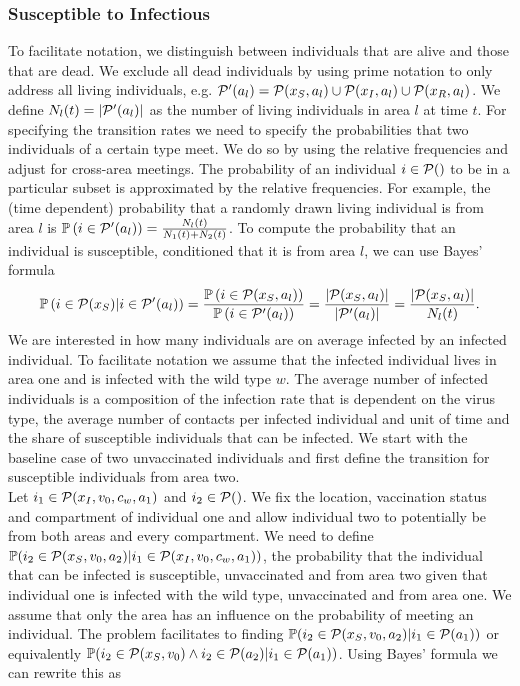 \subsubsection*{Susceptible to Infectious}
To facilitate notation, we distinguish between individuals that are alive and those that are dead. We exclude all dead individuals by using prime notation to only address all living individuals, e.g. $\mathcal{P}'(a_l) =  \mathcal{P}(x_S, a_l) \cup \mathcal{P}(x_I, a_l) \cup \mathcal{P}(x_R, a_l)$. We define $N_l(t) = |\mathcal{P}'(a_l) |$ as the number of living individuals in area $l$ at time $t$. For specifying the transition rates we need to specify the probabilities that two individuals of a certain type meet. We do so by using the relative frequencies and adjust for cross-area meetings. The probability of an individual $i \in \mathcal{P}()$ to be in a particular subset is approximated by the relative frequencies. For example, the (time dependent) probability that a randomly drawn living individual is from area $l$ is $\mathbb{P}\left(i \in \mathcal{P}'(a_l) \right) = \frac{N_l(t)}{N_1(t) + N_2(t)}$. To compute the probability that an individual is susceptible, conditioned that it is from area $l$, we can use Bayes' formula 
\begin{align}
\mathbb{P}\left( i \in \mathcal{P}(x_S) |  i \in \mathcal{P}'(a_l) \right)= \frac{\mathbb{P}\left(i \in  \mathcal{P}(x_S, a_l) \right)}{\mathbb{P}\left(i \in \mathcal{P}'(a_l)\right)} = \frac{|\mathcal{P}(x_S, a_l)|}{|\mathcal{P}'(a_l)|} = \frac{|\mathcal{P}(x_S, a_l)|}{N_l(t)}.
\end{align}
We are interested in how many individuals are on average infected by an infected individual. To facilitate notation we assume that the infected individual lives in area one and is infected with the wild type $w$. The average number of infected individuals is a composition of the infection rate that is dependent on the virus type, the average number of contacts per infected individual and unit of time and the share of susceptible individuals that can be infected. We start with the baseline case of two unvaccinated individuals and first define the transition for susceptible individuals from area two.\\ 
Let $i_1 \in \mathcal{P}(x_I, v_0, c_w, a_1)$ and $i_2 \in \mathcal{P}()$.  We fix the location, vaccination status and compartment of individual one and allow individual two to potentially be from both areas and every compartment. We need to define $\mathbb{P}(i_2 \in \mathcal{P}(x_S, v_0 ,a_2)|i_1 \in \mathcal{P}(x_I, v_0,c_w, a_1))$, the probability that the individual that can be infected is susceptible, unvaccinated and from area two given that individual one is infected with the wild type, unvaccinated and from area one. We assume that only the area has an influence on the probability of meeting an individual. The problem facilitates to finding $\mathbb{P}(i_2 \in \mathcal{P}(x_S, v_0 ,a_2)|i_1 \in \mathcal{P}(a_1))$ or equivalently $\mathbb{P}(i_2 \in \mathcal{P}(x_S, v_0) \wedge i_2 \in \mathcal{P}(a_2) | i_1 \in \mathcal{P}(a_1))$. Using Bayes' formula we can rewrite this as
